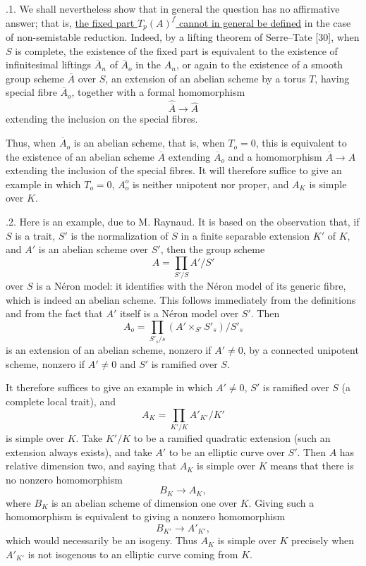 \medskip
{}.1. We shall nevertheless show that in general the question has no
affirmative answer; that is, \underline{the fixed part $T_p(A)^f$
cannot in general be defined} in the case of non-semistable reduction.
Indeed, by a lifting theorem of Serre--Tate [30], when $S$ is complete,
the existence of the fixed part is equivalent to the existence of
infinitesimal liftings $\overline A_n$ of $\overline A_o$ in the $A_n$,
or again to the existence of a smooth group scheme $\overline A$ over
$S$, an extension of an abelian scheme by a torus $T$, having special
fibre $\overline A_o$, together with a formal homomorphism
\[
 \widehat{\overline A}\longrightarrow\widehat A
\]
extending the inclusion on the special fibres.

Thus, when $\overline A_o$ is an abelian scheme, that is, when $T_o=0$,
this is equivalent to the existence of an abelian scheme $\overline A$
extending $\overline A_o$ and a homomorphism
$\overline A\longrightarrow A$ extending the inclusion of the special
fibres.  It will therefore suffice to give an example in which $T_o=0$,
$A_o^o$ is neither unipotent nor proper, and $A_K$ is simple over $K$.

\medskip
{}.2. Here is an example, due to M. Raynaud.  It is based on the
observation that, if $S$ is a trait, $S'$ is the normalization of $S$
in a finite separable extension $K'$ of $K$, and $A'$ is an abelian
scheme over $S'$, then the group scheme
\[
 A=\prod_{S'/S} A'/S'
\]
over $S$ is a N\'eron model: it identifies with the N\'eron model of its
generic fibre, which is indeed an abelian scheme.  This follows
immediately from the definitions and from the fact that $A'$ itself is
a N\'eron model over $S'$.  Then
\[
 A_o=\prod_{S'_s/s}(A'\times_{S'}S'_s)/S'_s
\]
is an extension of an abelian scheme, nonzero if $A'\neq0$, by a
connected unipotent scheme, nonzero if $A'\neq0$ and $S'$ is ramified
over $S$.

It therefore suffices to give an example in which $A'\neq0$, $S'$ is
ramified over $S$ (a complete local trait), and
\[
 A_K=\prod_{K'/K}A'_{K'}/K'
\]
is simple over $K$.  Take $K'/K$ to be a ramified quadratic extension
(such an extension always exists), and take $A'$ to be an elliptic
curve over $S'$.  Then $A$ has relative dimension two, and saying that
$A_K$ is simple over $K$ means that there is no nonzero homomorphism
\[
 B_K\longrightarrow A_K,
\]
where $B_K$ is an abelian scheme of dimension one over $K$.  Giving
such a homomorphism is equivalent to giving a nonzero homomorphism
\[
 B_{K'}\longrightarrow A'_{K'},
\]
which would necessarily be an isogeny.  Thus $A_K$ is simple over $K$
precisely when $A'_{K'}$ is not isogenous to an elliptic curve coming
from $K$.

